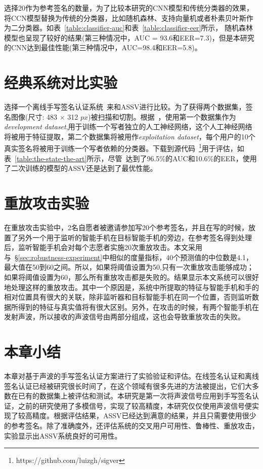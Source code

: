 选择20作为参考签名的数量，为了比较本研究的CNN模型和传统分类器的效果，将CCN模型替换为传统的分类器，比如随机森林、支持向量机或者朴素贝叶斯作为二分类器。如表~\ref{table:classifier-auc}和表~\ref{table:classifier-eer}所示，
随机森林模型也呈现了较好的结果(第三种情况中，AUC = 93.6和EER=7.3)，但是本研究的CNN达到最佳性能(第三种情况中，AUC=98.4和EER=5.8)。

\section{经典系统对比实验}
选择一个离线手写签名认证系统~\cite{hafemann2017learning}来和ASSV进行比较。为了获得两个数据集，签名图像(尺寸: 483 $\times$ 312 $px$)被扫描和切割。根据~\cite{hafemann2017learning}，使用第一个数据集作为\textit{development dataset},用于训练一个写者独立的人工神经网络，这个人工神经网络将被用于特征提取，第二个数据集将被用作\textit{exploitation dataset}，每个用户的10个真实签名将被用于训练一个写者依赖的分类器。下载到源代码~\footnote{https://github.com/luizgh/sigver}用于评估，如表~\ref{table:the-state-the-art}所示，尽管~\cite{hafemann2017learning}达到了96.5\%的AUC和10.6\%的EER，使用了二次训练的模型的ASSV还是达到了最优性能。


\section{重放攻击实验}

在重放攻击实验中，2名自愿者被邀请参加写20个参考签名，并且在写的时候，放置了另外一个用于监听的智能手机在目标智能手机的旁边，在参考签名得到处理后，监听智能手机会对每个志愿者实施20次重放攻击。本文采用与~\S\ref{sec:robustness-experiment}中相似的度量指标，40个预测值的中位数是4.1，最大值在50到60之间。所以，如果将阈值设置为50,只有一次重放攻击能够成功；如果将阈值设置为60，那么所有重放攻击都是失败的。结果显示本文系统可以很好地处理这样的重放攻击。其中一个原因是，系统中所提取的特征与智能手机和手的相对位置具有很大的关联，除非监听器和目标智能手机在同一个位置，否则监听数据所得到的特征与真实值将有很大区别。另外，在攻击的时候，有两个智能手机在发射声波，所以接收的声波信号由两部分组成，这也会导致重放攻击的失败。

\section{本章小结}
本章对基于声波的手写签名认证方案进行了实验验证和评估。在线签名认证和离线签名认证已经被研究很长时间了，在这个领域有很多先进的方法被提出，它们大多数在已有的数据集上被评估和测试。本研究是第一次将声波信号应用到手写签名认证，之前的研究使用了多模信号，实现了较高精度，本研究仅仅使用声波信号便实现了较高精度。根据评估结果，ASSV已经达到满意的结果，并且只需要使用很少的参考签名。除了准确度外，还评估系统的交叉用户可用性、鲁棒性、重放攻击，实验显示出ASSV系统良好的可用性。

